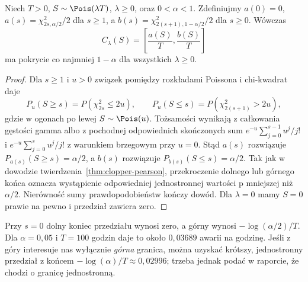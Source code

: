 \begin{twierdzenie}
\label{thm:poisson-ci}
Niech $T>0$, $S\sim\Pois(\lambda T)$, $\lambda\ge0$,
oraz $0<\alpha<1$. Zdefiniujmy $a(0)=0$,
$a(s)=\chi^2_{2s,\alpha/2}/2$ dla $s\ge1$, a
$b(s)=\chi^2_{2(s+1),1-\alpha/2}/2$ dla $s\ge0$.
Wówczas
\[
 C_\lambda(S)=\left[\frac{a(S)}T,\frac{b(S)}T\right]
\]
ma pokrycie co najmniej $1-\alpha$ dla wszystkich
$\lambda\ge0$.
\end{twierdzenie}
\begin{proof}
Dla $s\ge1$ i $u>0$ związek pomiędzy rozkładami
Poissona i chi-kwadrat daje
\[
 P_{u}(S\ge s)=P(\chi^2_{2s}\le2u),\qquad
 P_{u}(S\le s)=P(\chi^2_{2(s+1)}>2u),
\]
gdzie w ogonach po lewej $S\sim\Pois(u)$.
Tożsamości wynikają z całkowania gęstości gamma albo
z pochodnej odpowiednich skończonych sum
$e^{-u}\sum_{j=0}^{s-1}u^j/j!$ i
$e^{-u}\sum_{j=0}^{s}u^j/j!$ z warunkiem brzegowym
przy $u=0$. Stąd $a(s)$ rozwiązuje
$P_{a(s)}(S\ge s)=\alpha/2$, a $b(s)$ rozwiązuje
$P_{b(s)}(S\le s)=\alpha/2$.
Tak jak w dowodzie twierdzenia~\ref{thm:clopper-pearson},
przekroczenie dolnego lub górnego końca oznacza wystąpienie
odpowiedniej jednostronnej wartości p mniejszej niż
$\alpha/2$. Nierówność sumy prawdopodobieństw kończy
dowód. Dla $\lambda=0$ mamy $S=0$ prawie na pewno
i przedział zawiera zero.
\end{proof}

\begin{przyklad}
Przy $s=0$ dolny koniec przedziału wynosi zero,
a górny wynosi $-\log(\alpha/2)/T$. Dla
$\alpha=0{,}05$ i $T=100$ godzin daje to około
$0{,}03689$ awarii na godzinę. Jeśli z góry
interesuje nas wyłącznie \emph{górna} granica, można
uzyskać krótszy, jednostronny przedział z końcem
$-\log(\alpha)/T\approx0{,}02996$; trzeba jednak
podać w raporcie, że chodzi o granicę jednostronną.
\end{przyklad}

